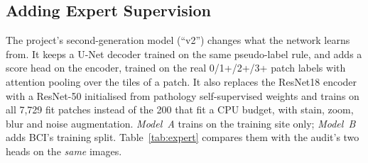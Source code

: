 \documentclass[conference]{IEEEtran}
\begin{document}
\subsection{Adding Expert Supervision}
\label{sec:expert}

The project's second-generation model (``v2'') changes what the network learns from. It keeps a U-Net decoder trained on the same pseudo-label rule, and adds
a score head on the encoder, trained on the real 0/1+/2+/3+ patch labels with attention pooling over the tiles of a patch. It also replaces the ResNet18
encoder with a ResNet-50 initialised from pathology self-supervised weights and trains on all 7{,}729 fit patches instead of the 200 that fit a CPU budget,
with stain, zoom, blur and noise augmentation. \emph{Model~A} trains on the training site only; \emph{Model~B} adds BCI's training split.
Table~\ref{tab:expert} compares them with the audit's two heads on the \emph{same} images.

\begin{table}[t]
\centering
\caption{Accuracy against the expert category on the same images. Heads in the first two rows: DAB-pseudo-label network and the threshold rule (Table~\ref{tab:audit}). Paired differences are against the rule head; 95\% bootstrap intervals. Model B has seen BCI's training split, so its BCI column is a seen-site result; ADEL is unseen by both.}
\label{tab:expert}
\scriptsize\setlength{\tabcolsep}{3pt}
\end{table}
\end{document}
